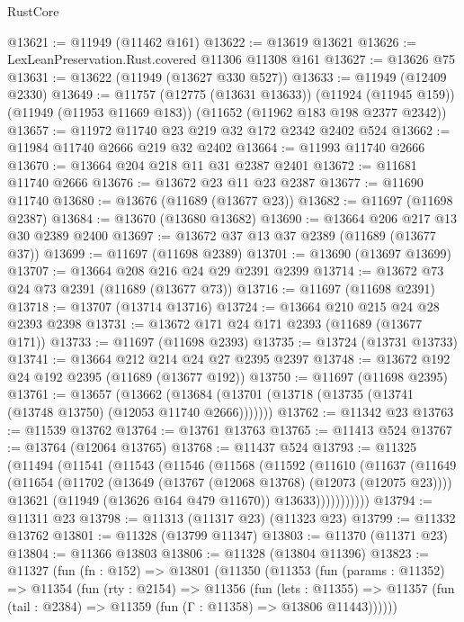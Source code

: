 \begin{lexlean}{RustCore}
\begin{coremodule}
@13621 := @11949 (@11462 @161)
@13622 := @13619 @13621
@13626 := LexLeanPreservation.Rust.covered @11306 @11308 @161
@13627 := @13626 @75
@13631 := @13622 (@11949 (@13627 @330 @527))
@13633 := @11949 (@12409 @2330)
@13649 := @11757
    (@12775 (@13631 @13633))
    (@11924 (@11945 @159))
    (@11949 (@11953 @11669 @183))
    (@11652 (@11962 @183 @198 @2377 @2342))
@13657 := @11972 @11740 @23 @219 @32 @172 @2342 @2402 @524
@13662 := @11984 @11740 @2666 @219 @32 @2402
@13664 := @11993 @11740 @2666
@13670 := @13664 @204 @218 @11 @31 @2387 @2401
@13672 := @11681 @11740 @2666
@13676 := @13672 @23 @11 @23 @2387
@13677 := @11690 @11740
@13680 := @13676 (@11689 (@13677 @23))
@13682 := @11697 (@11698 @2387)
@13684 := @13670 (@13680 @13682)
@13690 := @13664 @206 @217 @13 @30 @2389 @2400
@13697 := @13672 @37 @13 @37 @2389 (@11689 (@13677 @37))
@13699 := @11697 (@11698 @2389)
@13701 := @13690 (@13697 @13699)
@13707 := @13664 @208 @216 @24 @29 @2391 @2399
@13714 := @13672 @73 @24 @73 @2391 (@11689 (@13677 @73))
@13716 := @11697 (@11698 @2391)
@13718 := @13707 (@13714 @13716)
@13724 := @13664 @210 @215 @24 @28 @2393 @2398
@13731 := @13672 @171 @24 @171 @2393 (@11689 (@13677 @171))
@13733 := @11697 (@11698 @2393)
@13735 := @13724 (@13731 @13733)
@13741 := @13664 @212 @214 @24 @27 @2395 @2397
@13748 := @13672 @192 @24 @192 @2395 (@11689 (@13677 @192))
@13750 := @11697 (@11698 @2395)
@13761 := @13657
    (@13662 (@13684 (@13701 (@13718 (@13735 (@13741 (@13748 @13750) (@12053 @11740 @2666)))))))
@13762 := @11342 @23
@13763 := @11539 @13762
@13764 := @13761 @13763
@13765 := @11413 @524
@13767 := @13764 (@12064 @13765)
@13768 := @11437 @524
@13793 := @11325
    (@11494
      (@11541
        (@11543
          (@11546
            (@11568
              (@11592
                (@11610
                  (@11637
                    (@11649
                      (@11654
                        (@11702
                          (@13649 (@13767 (@12068 @13768) (@12073 (@12075 @23))))
                          @13621
                          (@11949 (@13626 @164 @479 @11670))
                          @13633)))))))))))
@13794 := @11311 @23
@13798 := @11313 (@11317 @23) (@11323 @23)
@13799 := @11332 @13762
@13801 := @11328 (@13799 @11347)
@13803 := @11370 (@11371 @23)
@13804 := @11366 @13803
@13806 := @11328 (@13804 @11396)
@13823 := @11327
    (fun (fn : @152) =>
    @13801
      (@11350
        (@11353
          (fun (params : @11352) =>
          @11354
            (fun (rty : @2154) =>
            @11356
              (fun (lets : @11355) =>
              @11357 (fun (tail : @2384) => @11359 (fun (Γ : @11358) => @13806 @11443))))))

\end{coremodule}
\end{lexlean}
